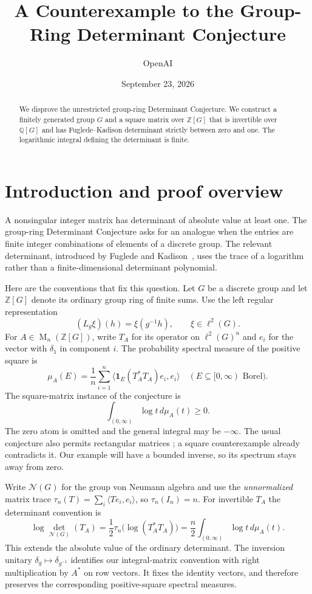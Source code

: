 \documentclass[11pt]{article}
\title{A Counterexample to the Group-Ring Determinant Conjecture}
\author{OpenAI}
\date{September 23, 2026}
\theoremstyle{remark}
\numberwithin{equation}{section}
\newcommand{\Z}{\mathbb Z}
\newcommand{\Mat}{\operatorname{M}}
\newcommand{\N}{\mathcal N}
\begin{document}
\maketitle
\begin{abstract}
We disprove the unrestricted group-ring Determinant Conjecture. We construct a finitely generated group $G$ and a square matrix over $\mathbb Z[G]$ that is invertible over $\mathbb Q[G]$ and has Fuglede--Kadison determinant strictly between zero and one. The logarithmic integral defining the determinant is finite.
\end{abstract}

\section{Introduction and proof overview}
\label{sec:introduction}

A nonsingular integer matrix has determinant of absolute
value at least one. The group-ring Determinant Conjecture asks for an
analogue when the entries are finite integer combinations of elements
of a discrete group. The relevant determinant, introduced by Fuglede
and Kadison~\cite{FK1952}, uses the trace of a logarithm rather than
a finite-dimensional determinant polynomial.

Here are the conventions that fix this question. Let $G$ be a discrete
group and let $\Z[G]$ denote its ordinary group ring of finite sums.
Use the left regular representation
\[
 (L_g\xi)(h)=\xi(g^{-1}h),\qquad \xi\in\ell^2(G).
\]
For $A\in\Mat_n(\Z[G])$, write $T_A$ for its operator on
$\ell^2(G)^n$ and $e_i$ for the vector with $\delta_1$ in component
$i$. The probability spectral measure of the positive square is
\[
 \mu_A(E)=\frac1n\sum_{i=1}^n
 \langle \mathbf1_E(T_A^*T_A)e_i,e_i\rangle
 \quad(E\subseteq[0,\infty)\text{ Borel}).
\]
The square-matrix instance of the conjecture is
\begin{equation}\label{eq:conjecture}
 \int_{(0,\infty)}\log t\,d\mu_A(t)\ge0.
\end{equation}
The zero atom is omitted and the general integral may be $-\infty$.
The usual conjecture also permits rectangular matrices
\cite[Conjecture 13.2]{Luck2002}; a square counterexample already
contradicts it. Our example will have a bounded inverse, so its
spectrum stays away from zero.

Write $\N(G)$ for the group von Neumann algebra and use the
\emph{unnormalized} matrix trace
$\tau_n(T)=\sum_i\langle Te_i,e_i\rangle$, so $\tau_n(I_n)=n$.
For invertible $T_A$ the determinant convention is
\begin{equation}\label{eq:normalization}
 \log\det_{\N(G)}(T_A)
 =\frac12\tau_n\bigl(\log(T_A^*T_A)\bigr)
 =\frac n2\int_{(0,\infty)}\log t\,d\mu_A(t).
\end{equation}
This extends the absolute value of the ordinary determinant.
The inversion unitary $\delta_g\mapsto\delta_{g^{-1}}$ identifies
our integral-matrix convention with right multiplication by $A^*$
on row vectors. It fixes the identity vectors, and therefore
preserves the corresponding positive-square spectral measures.
\end{document}
